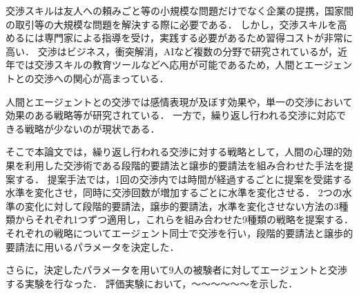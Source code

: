 
交渉スキルは友人への頼みごと等の小規模な問題だけでなく企業の提携，国家間の取引等の大規模な問題を解決する際に必要である．
しかし，交渉スキルを高めるには専門家による指導を受け，実践する必要があるため習得コストが非常に高い．
交渉はビジネス，衝突解消，AIなど複数の分野で研究されているが，近年では交渉スキルの教育ツールなどへ応用が可能であるため，人間とエージェントとの交渉への関心が高まっている．

人間とエージェントとの交渉では感情表現が及ぼす効果や，単一の交渉において効果のある戦略等が研究されている．
一方で，繰り返し行われる交渉に対応できる戦略が少ないのが現状である．

そこで本論文では，繰り返し行われる交渉に対する戦略として，人間の心理的効果を利用した交渉術である段階的要請法と譲歩的要請法を組み合わせた手法を提案する．
提案手法では，1回の交渉内では時間が経過するごとに提案を受諾する水準を変化させ，同時に交渉回数が増加するごとに水準を変化させる．
2つの水準の変化に対して段階的要請法，譲歩的要請法，水準を変化させない方法の3種類からそれぞれ1つずつ適用し，これらを組み合わせた9種類の戦略を提案する．
それぞれの戦略についてエージェント同士で交渉を行い，段階的要請法と譲歩的要請法に用いるパラメータを決定した．

さらに，決定したパラメータを用いて9人の被験者に対してエージェントと交渉する実験を行なった．
評価実験において，〜〜〜〜〜〜を示した．
